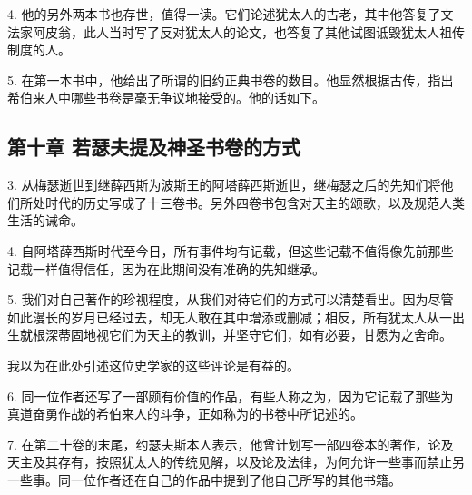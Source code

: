 4. 他的另外两本书也存世，值得一读。它们论述犹太人的古老，其中他答复了文法家阿皮翁，此人当时写了反对犹太人的论文，也答复了其他试图诋毁犹太人祖传制度的人。\par

5. 在第一本书中，他给出了所谓的旧约正典书卷的数目。他显然根据古传，指出希伯来人中哪些书卷是毫无争议地接受的。他的话如下。\par


\subsection{第十章  若瑟夫提及神圣书卷的方式}

\par

\par

3. 从梅瑟逝世到继薛西斯为波斯王的阿塔薛西斯逝世，继梅瑟之后的先知们将他们所处时代的历史写成了十三卷书。另外四卷书包含对天主的颂歌，以及规范人类生活的诫命。\par

4. 自阿塔薛西斯时代至今日，所有事件均有记载，但这些记载不值得像先前那些记载一样值得信任，因为在此期间没有准确的先知继承。\par

5. 我们对自己著作的珍视程度，从我们对待它们的方式可以清楚看出。因为尽管如此漫长的岁月已经过去，却无人敢在其中增添或删减；相反，所有犹太人从一出生就根深蒂固地视它们为天主的教训，并坚守它们，如有必要，甘愿为之舍命。\par

我以为在此处引述这位史学家的这些评论是有益的。\par

6. 同一位作者还写了一部颇有价值的作品，有些人称之为，因为它记载了那些为真道奋勇作战的希伯来人的斗争，正如称为的书卷中所记述的。\par

7. 在第二十卷的末尾，约瑟夫斯本人表示，他曾计划写一部四卷本的著作，论及天主及其存有，按照犹太人的传统见解，以及论及法律，为何允许一些事而禁止另一些事。同一位作者还在自己的作品中提到了他自己所写的其他书籍。\par

